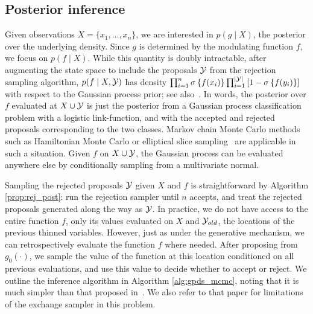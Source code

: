 \subsection{Posterior inference}
Given observations $X = \{x_1, \ldots, x_n\}$,
we are interested in $p(g\mid X)$, the posterior over the underlying density. %
Since $g$ is determined by the modulating function $f$, we focus on %
$p(f\mid X)$. %
While this quantity is doubly intractable,
after augmenting the state space to include the proposals $\mathcal{Y}$ from the rejection sampling algorithm, %
 $p(f\mid X,\mathcal{Y})$ has density $\prod_{i=1}^n \sigma\left\{f(x_i)\right\} \prod_{i=1}^{|\mathcal{Y}|} \left[1-\sigma\left\{f(y_i)\right\}\right]$
  with respect to the Gaussian process prior; see also~\cite{adams_gpds}.
In words, the posterior over $f$ evaluated at $X \cup \mathcal{Y}$ is just the posterior from a Gaussian process
classification problem with a logistic link-function, and with the accepted and rejected proposals corresponding to the two classes.
Markov chain Monte Carlo methods such as Hamiltonian Monte Carlo or elliptical slice sampling~\citep{murray2010} 
are applicable in such a situation. Given $f$ on $X \cup \mathcal{Y}$, the Gaussian process can be evaluated anywhere else by 
conditionally sampling from a multivariate normal.

Sampling the rejected proposals $\mathcal{Y}$ given $X$ and $f$ is straightforward by Algorithm \ref{prop:rej_post}:
run the rejection sampler until $n$ accepts, and treat the rejected proposals generated
along the way as $\mathcal{Y}$. In practice, we do not have access to the entire function $f$, only its
values evaluated on $X$ and $\mathcal{Y}_{old}$, the locations of the previous thinned variables. However, just as under the generative 
mechanism, we can retrospectively evaluate the function $f$ where needed.
After proposing from $g_0(\cdot)$, we sample the value of the function at this location conditioned on all previous evaluations, and
use this value to decide whether to accept or reject. We outline the inference algorithm in
Algorithm \ref{alg:gpds_mcmc}, noting that it is much simpler than that proposed in~\cite{adams_gpds}.
We also refer to that paper for limitations of the exchange sampler in this problem.

